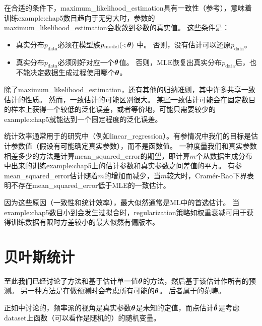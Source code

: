 在合适的条件下，\gls{maximum_likelihood_estimation}具有一致性（参考），意味着训练\gls{example:chap5}数目趋向于无穷大时，参数的\gls{maximum_likelihood_estimation}会收敛到参数的真实值。
这些条件是：
\begin{itemize}
    \item 真实分布$p_{\text{data}}$必须在模型族$p_{\text{model}}(\cdot; \boldsymbol{\theta})$ 中。
    否则，没有估计可以还原$p_{\text{data}}$。
    
    \item 真实分布$p_{\text{data}}$必须刚好对应一个$\boldsymbol{\theta}$值。
    否则，\gls{MLE}恢复出真实分布$p_{\text{data}}$后，也不能决定数据生成过程使用哪个$\boldsymbol{\theta}$。
\end{itemize}

除了\gls{maximum_likelihood_estimation}，还有其他的归纳准则，其中许多共享一致估计的性质。
然而，一致估计的可能区别很大。
某些一致估计可能会在固定数目的样本上获得一个较低的泛化误差，或者等价地，可能只需要较少的\gls{example:chap5}就能达到一个固定程度的泛化误差。

统计效率通常用于的研究中（例如\gls{linear_regression}）。有参情况中我们的目标是估计参数值（假设有可能确定真实参数），而不是函数值。
一种度量我们和真实参数相差多少的方法是计算\gls{mean_squared_error}的期望，即计算$m$个从数据生成分布中出来的训练\gls{example:chap5}上的估计参数和真实参数之间差值的平方。
有参\gls{mean_squared_error}估计随着$m$的增加而减少，当$m$较大时，Cram\'er-Rao下界\citep{Rao-1945,Cramer-1946}表明不存在\gls{mean_squared_error}低于\gls{MLE}的一致估计。

因为这些原因（一致性和统计效率），最大似然通常是\gls{ML}中的首选估计。
当\gls{example:chap5}数目小到会发生过拟合时，\gls{regularization}策略如权重衰减可用于获得训练数据有限时方差较小的最大似然有偏版本。


\section{贝叶斯统计}
\label{sec:bayesian_statistics}
至此我们已经讨论了方法和基于估计单一值$\boldsymbol{\theta}$的方法，然后基于该估计作所有的预测。
另一种方法是在做预测时会考虑所有可能的$\boldsymbol{\theta}$。
后者属于的范畴。

正如中讨论的，频率派的视角是真实参数$\boldsymbol{\theta}$是未知的定值，而点估计$\hat{\boldsymbol{\theta}}$是考虑\gls{dataset}上函数（可以看作是随机的）的随机变量。

